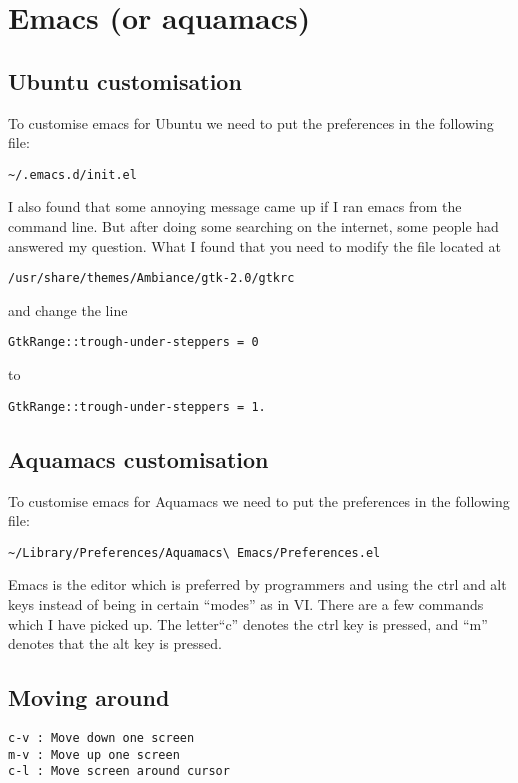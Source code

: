 \documentclass[a4paper, 10pt]{article}
\begin{document}
\section*{Emacs (or aquamacs)}

\subsection*{Ubuntu customisation}
\label{sec:ubuntu-customisation}

To customise emacs for Ubuntu we need to put the preferences in the
following file:
\begin{verbatim}
~/.emacs.d/init.el
\end{verbatim}

I also found that some annoying message came up if I ran emacs from
the command line. But after doing some searching on the internet, some
people had answered my question. What I found that you need to modify
the file located at
\begin{verbatim}
/usr/share/themes/Ambiance/gtk-2.0/gtkrc
\end{verbatim}
and change the line 
\begin{verbatim}
GtkRange::trough-under-steppers = 0
\end{verbatim}
to 
\begin{verbatim}
GtkRange::trough-under-steppers = 1.
\end{verbatim}



\subsection*{Aquamacs customisation}
\label{sec:ubuntu-customisation}

To customise emacs for Aquamacs we need to put the preferences in the
following file:
\begin{verbatim}
~/Library/Preferences/Aquamacs\ Emacs/Preferences.el
\end{verbatim}

Emacs is the editor which is preferred by programmers and using the ctrl and alt keys instead of being in certain ``modes'' as in VI. There are a few commands which I have picked up. The letter``c'' denotes the ctrl key is pressed, and ``m'' denotes that the alt key is pressed.

\subsection*{Moving around}
\begin{verbatim}
c-v : Move down one screen
m-v : Move up one screen
c-l : Move screen around cursor
 \end{verbatim}
 
\end{document}
